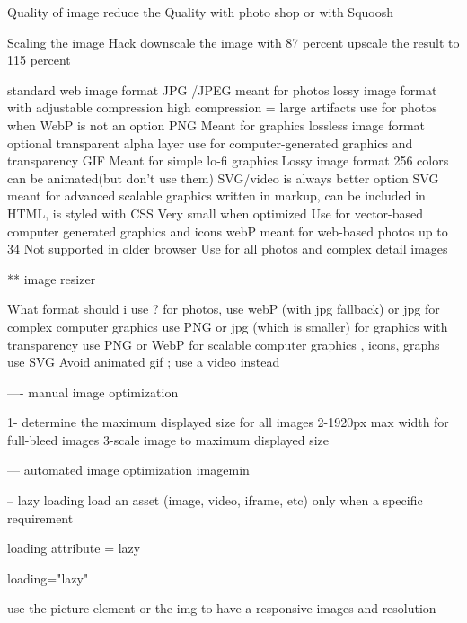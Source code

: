 Quality of image 
  reduce the Quality with photo shop 
  or with Squoosh 

  Scaling the image Hack 
  downscale the image with 87 percent 
  upscale the result to 115 percent 

  standard web image format 
    JPG /JPEG 
      meant for photos 
      lossy image format with adjustable compression 
      high compression = large artifacts
      use for photos when WebP is not an option 
    PNG
      Meant for graphics 
      lossless image format 
      optional transparent alpha layer 
      use for computer-generated graphics and transparency 
    GIF
      Meant for simple lo-fi graphics 
      Lossy image format 
      256 colors 
      can be animated(but don't use them)
      SVG/video is always better option 
    SVG     
      meant for advanced scalable graphics 
      written in markup, can be included in HTML, is styled with CSS 
      Very small when optimized 
      Use for vector-based computer generated graphics and icons
    webP
      meant for web-based photos 
      up to 34%
      Not supported in older browser 
      Use for all photos and complex detail images 


** image resizer 

What format should i use ? 
for photos, use webP (with jpg fallback) or jpg 
for complex computer graphics use PNG or jpg (which is smaller)
for graphics with transparency use PNG or WebP
for scalable computer graphics , icons, graphs use SVG 
Avoid animated gif ; use a video instead 

---- manual image optimization 

1- determine the maximum displayed size for all images 
2-1920px max width for full-bleed images
3-scale image to maximum displayed size 

--- automated image optimization 
  imagemin 


-- lazy loading 
load an asset (image, video, iframe, etc) only when a specific requirement 

loading attribute = lazy   

loading="lazy" 

use the picture element or the img to have a responsive images and resolution 

